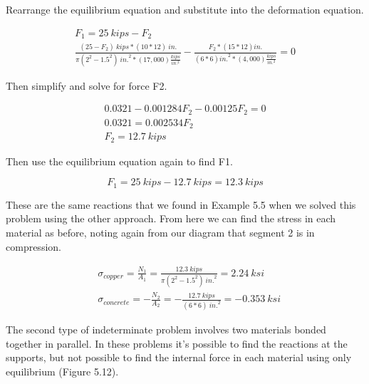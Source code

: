 \documentclass[
  letterpaper,
  DIV=11,
  numbers=noendperiod]{scrreprt}
\theoremstyle{definition}
\theoremstyle{remark}
\begin{document}
\begin{tcolorbox}
\begin{tcolorbox}
Rearrange the equilibrium equation and substitute into the deformation
equation.

\[
\begin{gathered}
F_1=25{~kips}-F_2 \\
\frac{(25-F_2){~kips} *(10 * 12){~in.}}{\pi(2^2-1.5^2){~in.}^2 *(17,000)\frac{kips}{in.^2}}-\frac{F_2 *(15 * 12){in.}}{(6 * 6){in.}^2 *(4,000)\frac{kips}{in.^2}}=0
\end{gathered}
\]

Then simplify and solve for force F2.

\[
\begin{gathered}
0.0321-0.001284 F_2-0.00125 F_2=0 \\
0.0321=0.002534 F_2 \\
F_2=12.7 {~kips}
\end{gathered}
\]

Then use the equilibrium equation again to find F1.

\[
F_1=25{~kips}-12.7{~kips}=12.3{~kips}
\]

These are the same reactions that we found in Example 5.5 when we solved
this problem using the other approach. From here we can find the stress
in each material as before, noting again from our diagram that segment 2
is in compression.

\[
\begin{aligned}
& \sigma_{copper}=\frac{N_1}{A_1}=\frac{12.3{~kips}}{\pi(2^2-1.5^2){~in.}^2}=2.24 {~ksi} \\
& \sigma_{concrete}=-\frac{N_2}{A_2}=-\frac{12.7{~kips}}{(6 * 6){~in.}^2}=-0.353 {~ksi}
\end{aligned}
\]

\end{tcolorbox}

\end{tcolorbox}

The second type of indeterminate problem involves two materials bonded
together in parallel. In these problems it's possible to find the
reactions at the supports, but not possible to find the internal force
in each material using only equilibrium (Figure 5.12).
\end{document}
